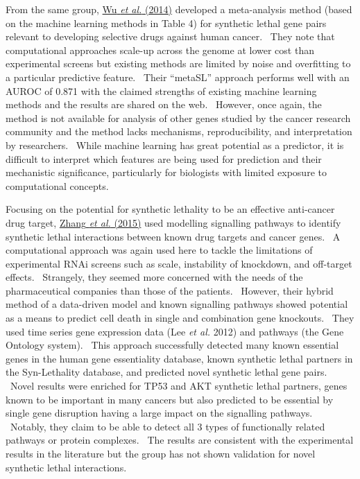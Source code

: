 From the same group,
\hyperlink{ENREF114}{Wu}\hyperlink{ENREF114}{\textit{ et
al.}}\hyperlink{ENREF114}{ (2014)} developed a meta-analysis method
(based on the machine learning methods in Table 4) for synthetic lethal
gene pairs relevant to developing selective drugs against human cancer.
\ They note that computational approaches scale-up across the genome at
lower cost than experimental screens but existing methods are limited
by noise and overfitting to a particular predictive feature. \ Their
{\textquotedblleft}metaSL{\textquotedblright} approach performs well
with an AUROC of 0.871 with the claimed strengths of existing machine
learning methods and the results are shared on the web. \ However, once
again, the method is not available for analysis of other genes studied
by the cancer research community and the method lacks mechanisms,
reproducibility, and interpretation by researchers. \ While machine
learning has great potential as a predictor, it is difficult to
interpret which features are being used for prediction and their
mechanistic significance, particularly for biologists with limited
exposure to computational concepts. \ 


Focusing on the potential for synthetic lethality to be an effective
anti-cancer drug target,
\hyperlink{ENREF117}{Zhang}\hyperlink{ENREF117}{\textit{ et
al.}}\hyperlink{ENREF117}{ (2015)} used modelling signalling pathways
to identify synthetic lethal interactions between known drug targets
and cancer genes. \ A computational approach was again used here to
tackle the limitations of experimental RNAi screens such as scale,
instability of knockdown, and off-target effects. \ Strangely, they
seemed more concerned with the needs of the pharmaceutical companies
than those of the patients. \ However, their
{\textquotesingle}hybrid{\textquotesingle} method of a data-driven
model and known signalling pathways showed potential as a means to
predict cell death in single and combination gene knockouts. \ They
used time series gene expression data (Lee\textit{ et al.} 2012) and
pathways (the Gene Ontology system). \ This approach successfully
detected many known essential genes in the human gene essentiality
database, known synthetic lethal partners in the Syn-Lethality
database, and predicted novel synthetic lethal gene pairs. \ Novel
results were enriched for TP53 and AKT synthetic lethal partners, genes
known to be important in many cancers but also predicted to be
essential by single gene disruption having a large impact on the
signalling pathways. \ Notably, they claim to be able to detect all 3
types of functionally related pathways or protein complexes. \ The
results are consistent with the experimental results in the literature
but the group has not shown validation for novel synthetic lethal
interactions. \ 


